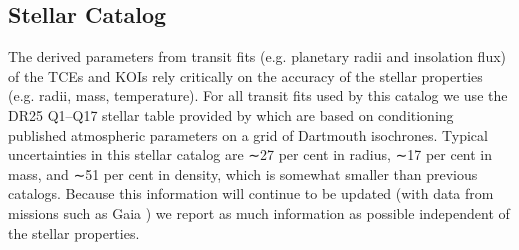 \subsection{Stellar Catalog}
The derived parameters from transit fits (e.g. planetary radii and insolation flux) of the TCEs and KOIs rely critically on the accuracy of the stellar properties (e.g. radii, mass, temperature).   For all transit fits used by this catalog we use the DR25 Q1--Q17 stellar table provided by \citet{Mathur2017} which are based on conditioning published atmospheric parameters on a grid of Dartmouth isochrones.  Typical uncertainties in this stellar catalog are ∼27 per cent in radius, ∼17 per cent in mass, and ∼51 per cent in density, which is somewhat smaller than previous catalogs. Because this information will continue to be updated (with data from missions such as Gaia \citet{Gaia}) we report as much information as possible independent of the stellar properties. 